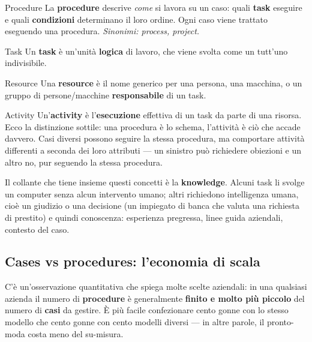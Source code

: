 \begin{boxdefinition}{Procedure}
La \textbf{procedure} descrive \emph{come} si lavora su un caso: quali \textbf{task} eseguire e quali \textbf{condizioni} determinano il loro ordine. Ogni caso viene trattato eseguendo una procedura. \emph{Sinonimi: process, project.}
\end{boxdefinition}

\begin{boxdefinition}{Task}
Un \textbf{task} è un'unità \textbf{logica} di lavoro, che viene svolta come un tutt'uno indivisibile.
\end{boxdefinition}

\begin{boxdefinition}{Resource}
Una \textbf{resource} è il nome generico per una persona, una macchina, o un gruppo di persone/macchine \textbf{responsabile} di un task.
\end{boxdefinition}

\begin{boxdefinition}{Activity}
Un'\textbf{activity} è l'\textbf{esecuzione} effettiva di un task da parte di una risorsa. Ecco la distinzione sottile: una procedura è lo schema, l'attività è ciò che accade davvero. Casi diversi possono seguire la stessa procedura, ma comportare attività differenti a seconda dei loro attributi — un sinistro può richiedere obiezioni e un altro no, pur seguendo la stessa procedura.
\end{boxdefinition}

Il collante che tiene insieme questi concetti è la \textbf{knowledge}. Alcuni task li svolge un computer senza alcun intervento umano; altri richiedono intelligenza umana, cioè un giudizio o una decisione (un impiegato di banca che valuta una richiesta di prestito) e quindi conoscenza: esperienza pregressa, linee guida aziendali, contesto del caso.

\subsection{\texorpdfstring{Cases vs procedures: l'economia di scala}{Cases vs procedures: l'economia di scala}}

C'è un'osservazione quantitativa che spiega molte scelte aziendali: in una qualsiasi azienda il numero di \textbf{procedure} è generalmente \textbf{finito e molto più piccolo} del numero di \textbf{casi} da gestire. È più facile confezionare cento gonne con lo stesso modello che cento gonne con cento modelli diversi — in altre parole, il pronto-moda costa meno del su-misura.

